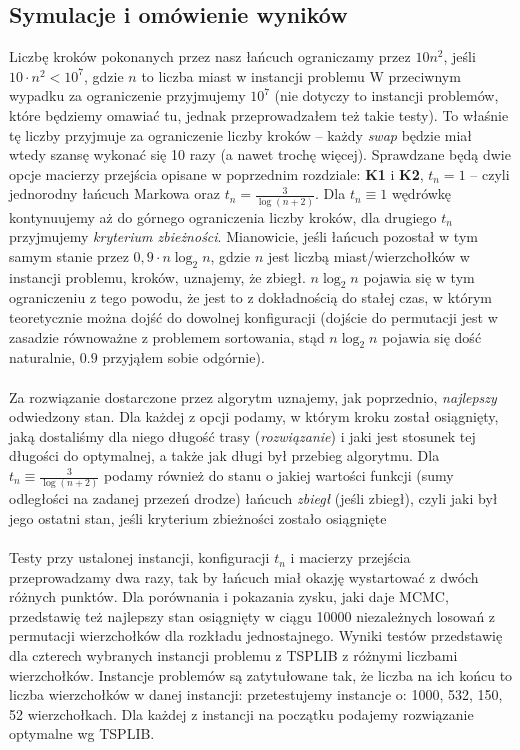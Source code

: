 \documentclass[a4paper]{article}
\theoremstyle{defn}
\theoremstyle{theorem}
\theoremstyle{lemma}
\theoremstyle{cor}
\theoremstyle{fact}
\begin{document}
\subsection{Symulacje i omówienie wyników}
\label{sect5.5}
Liczbę kroków pokonanych przez nasz łańcuch ograniczamy przez $10n^2$, jeśli $10\cdot n^2 < 10^7$, gdzie $n$ to liczba miast w instancji problemu W przeciwnym wypadku za ograniczenie przyjmujemy $10^7$ (nie dotyczy to instancji problemów, które będziemy omawiać tu, jednak przeprowadzałem też takie testy). To właśnie tę liczby przyjmuje za ograniczenie liczby kroków – każdy \textit{swap} będzie miał wtedy szansę wykonać się 10 razy (a nawet trochę więcej). Sprawdzane będą dwie opcje macierzy przejścia opisane w poprzednim rozdziale: \textbf{K1} i \textbf{K2}, $t_n = 1$ – czyli jednorodny łańcuch Markowa oraz $t_n = \frac{3}{\log(n+2)}$. Dla $t_n \equiv 1$ wędrówkę kontynuujemy aż do górnego ograniczenia liczby kroków, dla drugiego $t_n$ przyjmujemy \textit{kryterium zbieżności}. Mianowicie, jeśli łańcuch pozostał w tym samym stanie przez $0,9 \cdot n\log_2 n$, gdzie $n$ jest liczbą miast/wierzchołków w instancji problemu, kroków, uznajemy, że zbiegł. $n\log_2 n$ pojawia się w tym ograniczeniu z tego powodu, że jest to z dokładnością do stałej czas, w którym teoretycznie można dojść do dowolnej konfiguracji (dojście do permutacji jest w zasadzie równoważne z problemem sortowania, stąd $n\log_2 n$ pojawia się dość naturalnie, $0.9$ przyjąłem sobie odgórnie).\\\\
Za rozwiązanie dostarczone przez algorytm uznajemy, jak poprzednio, \textit{najlepszy} odwiedzony stan. Dla każdej z opcji podamy, w którym kroku został osiągnięty, jaką dostaliśmy dla niego długość trasy (\textit{rozwiązanie}) i jaki jest stosunek tej długości do optymalnej, a także jak długi był przebieg algorytmu. Dla $t_n \equiv \frac{3}{\log(n+2)}$ podamy również do stanu o jakiej wartości funkcji (sumy odległości na zadanej przezeń drodze) łańcuch \textit{zbiegł} (jeśli zbiegł), czyli jaki był jego ostatni stan, jeśli kryterium zbieżności zostało osiągnięte\\\\
Testy przy ustalonej instancji, konfiguracji $t_n$ i macierzy przejścia przeprowadzamy dwa razy, tak by łańcuch miał okazję wystartować z dwóch różnych punktów. Dla porównania i pokazania zysku, jaki daje MCMC, przedstawię też najlepszy stan osiągnięty w ciągu 10000 niezależnych losowań z permutacji wierzchołków dla rozkładu jednostajnego.  Wyniki testów przedstawię dla czterech wybranych instancji problemu z TSPLIB \cite{benchmark} z różnymi liczbami wierzchołków. Instancje problemów są zatytułowane tak, że liczba na ich końcu to liczba wierzchołków w danej instancji: przetestujemy instancje o: 1000, 532, 150, 52 wierzchołkach. Dla każdej z instancji na początku podajemy rozwiązanie optymalne wg TSPLIB.
\end{document}
